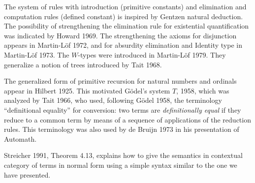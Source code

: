 \documentclass[10pt,a4paper]{article}
\begin{document}

 The system of rules with introduction (primitive constants) and elimination and computation rules
(defined constant) is inspired by Gentzen natural deduction. The possibility of strengthening
the elimination rule for existential quantification was indicated by Howard 1969. The strengthening
the axioms for disjunction appears in Martin-L\"of 1972, and for absurdity elimination and Identity type
in Martin-L\"of 1973. The $W$-types were introduced in Martin-L\"of 1979. They generalize a notion
of trees introduced by Tait 1968.%

 The generalized form of primitive recursion for natural numbers and ordinals appear in Hilbert 1925.
This motivated G\"odel's system $T$, 1958, which was analyzed by Tait 1966, who used, following
G\"odel 1958, the terminology
``definitional equality'' for conversion: two terms are {\em definitionally equal} if they reduce
to a common term by means of a sequence of applications of the reduction rules. This terminology was
also used by de Bruijn 1973 in his presentation of Automath.

 Streicher 1991, Theorem 4.13, explains how to give the semantics in contextual category of terms in normal
form using a simple syntax similar to the one we have presented.
\end{document}
